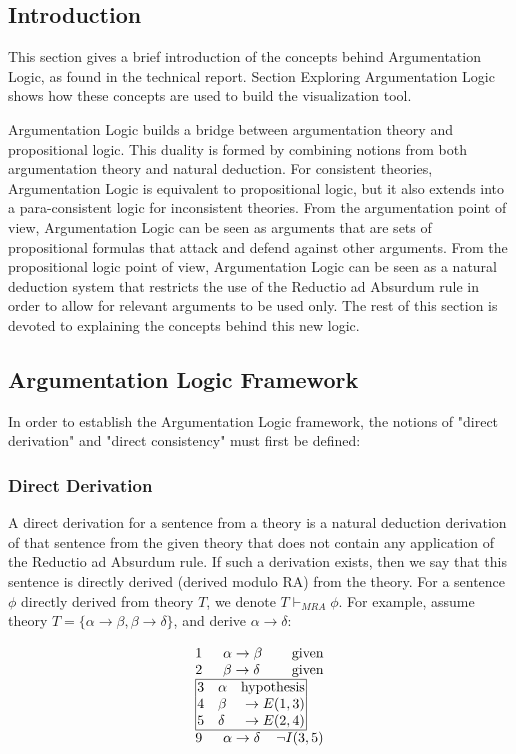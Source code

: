 \documentclass[11pt,twoside,a4paper]{report}
\begin{document}
\subsection{Introduction}
This section gives a brief introduction of the concepts behind Argumentation Logic, as found in the technical report. Section Exploring Argumentation Logic shows how these concepts are used to build the visualization tool.

Argumentation Logic builds a bridge between argumentation theory and propositional logic. This duality is formed by combining notions from both argumentation theory and natural deduction. For consistent theories, Argumentation Logic is equivalent to propositional logic, but it also extends into a para-consistent logic for inconsistent theories. From the argumentation point of view, Argumentation Logic can be seen as arguments that are sets of propositional formulas that attack and defend against other arguments. From the propositional logic point of view, Argumentation Logic can be seen as a natural deduction system that restricts the use of the Reductio ad Absurdum rule in order to allow for relevant arguments to be used only. The rest of this section is devoted to explaining the concepts behind this new logic.

\subsection{Argumentation Logic Framework}
In order to establish the Argumentation Logic framework, the notions of "direct derivation" and "direct consistency" must first be defined:

\subsubsection{Direct Derivation}
A direct derivation for a sentence from a theory is a natural deduction derivation of that sentence from the given theory that does not contain any application of the Reductio ad Absurdum rule. If such a derivation exists, then we say that this sentence is directly derived (derived modulo RA) from the theory. For a sentence $\phi$ directly derived from theory $T$, we denote $T\vdash_{MRA} \phi$.
For example, assume theory $T = \{\alpha\rightarrow\beta, \beta\rightarrow\delta\}$, and derive $\alpha\rightarrow\delta$:

\[\vbox{\offinterlineskip\halign{
&\tabskip=1.5em#\strut&$#$\hfil\tabskip=1em&\hfil$#$\tabskip=0em\cr
%
1&\alpha\rightarrow\beta&\mbox{given}\cr
2&\beta\rightarrow\delta&\mbox{given}\cr
%
\multispan3\vbox{\halign{
\vrule#&&\hskip.1em\tabskip=1em#\strut&$#$\hfil\tabskip=1em&\hfil$#$\hskip0.1em\tabskip=0em&\vrule#\cr
\noalign{\hrule}
%
&3&\alpha&\mbox{hypothesis}&\cr
&4&\beta&\rightarrow E(1,3)&\cr
&5&\delta&\rightarrow E(2,4)&\cr
%
\noalign{\hrule}}}\,\cr
%
9&\alpha\rightarrow\delta&\neg I(3,5)\cr
}}\]
\end{document}
